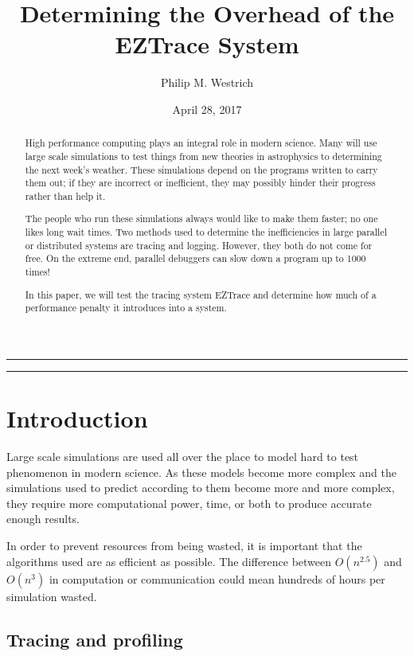 \documentclass[12pt]{article}
\title{Determining the Overhead of the EZTrace System}
\author{Philip M. Westrich}
\date{April 28, 2017}
\begin{document}
\maketitle
\vspace{-0.3in}\noindent\rule{\linewidth}{0.4pt}
\doublespacing

\begin{abstract}

    High performance computing plays an integral role in modern science. Many will use large scale simulations to test 
    things from new theories in astrophysics to determining the next week's weather. These simulations depend on the 
    programs written to carry them out; if they are incorrect or inefficient, they may possibly hinder their progress 
    rather than help it.
    
    The people who run these simulations always would like to make them faster; no one likes long wait times. Two methods 
    used to determine the inefficiencies in large parallel or distributed systems are tracing and logging. However, they 
    both do not come for free. On the extreme end, parallel debuggers can slow down a program up to 1000 times!
    
    In this paper, we will test the tracing system EZTrace and determine how much of a performance penalty it introduces 
    into a system.\\
 
\end{abstract}

\vspace{-0.3in}\noindent\rule{\linewidth}{0.4pt}
\pagebreak

\section{Introduction}

Large scale simulations are used all over the place to model hard to test phenomenon in modern science. As these models 
become more complex and the simulations used to predict according to them become more and more complex, they require more 
computational power, time, or both to produce accurate enough results.

In order to prevent resources from being wasted, it is important that the algorithms used are as efficient as possible. 
The difference between $ O(n^{2.5}) $ and $ O(n^3) $ in computation or communication could mean hundreds of hours per 
simulation wasted.

\subsection{Tracing and profiling}
\end{document}
